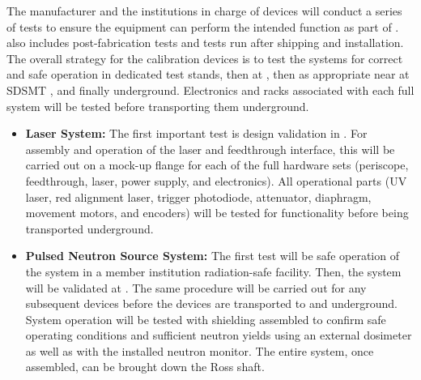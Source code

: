 
The manufacturer and the institutions in charge of devices will conduct a series of tests to ensure the equipment can perform the intended function as part of .  also includes post-fabrication tests and tests run after shipping and installation. The overall strategy for the calibration devices is to test the systems for correct and safe operation in dedicated test stands, then at , then as appropriate near  at SDSMT , and finally underground. Electronics and racks associated with each full system will be tested before transporting them underground.

\begin{itemize}
    \item {\bf Laser System:} The first %
    important test is  design validation in . For assembly and operation of the laser and feedthrough interface, this will be carried out on a mock-up flange for each of the full hardware sets (periscope, feedthrough, laser, power supply, and electronics). All operational parts (UV laser, red alignment laser, trigger photodiode, attenuator, diaphragm, movement motors, and encoders) will be tested for functionality before being transported underground.
    \item {\bf Pulsed Neutron Source System:} The first test will be safe operation of the system in a member institution radiation-safe facility. Then, the system will be validated at . The same procedure %
    will be carried out for any subsequent devices before the devices are transported to  and underground. System operation will be tested with shielding assembled to confirm safe operating conditions and sufficient neutron yields using an external dosimeter as well as with the installed neutron monitor. The entire system, once assembled, can be brought down the Ross shaft.
\end{itemize}
